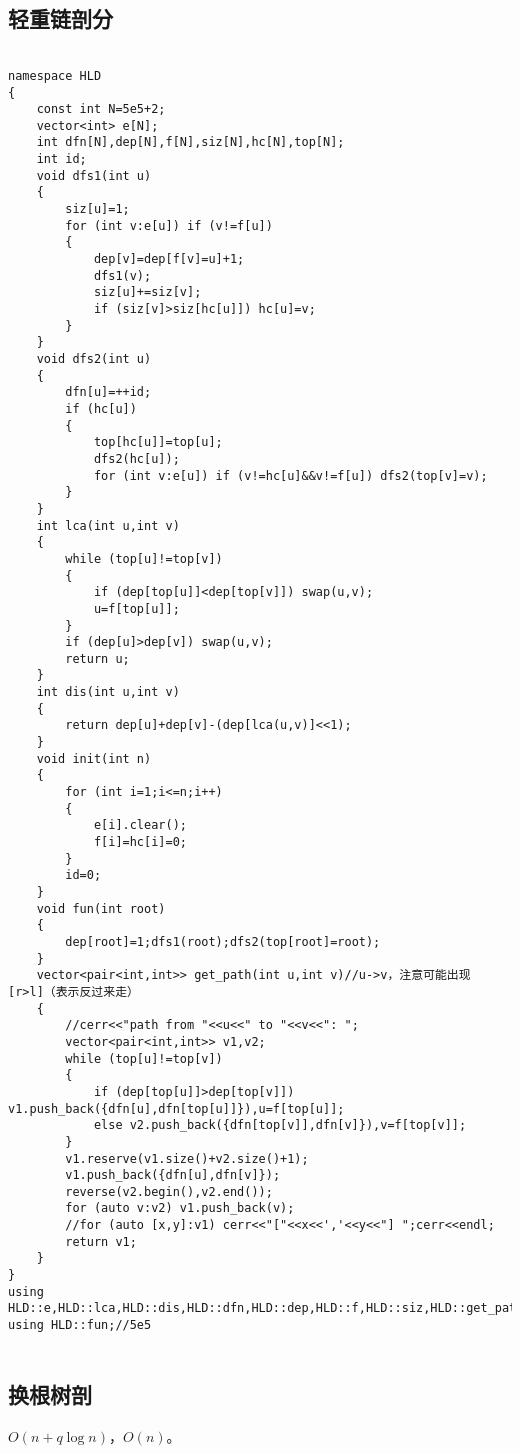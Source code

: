 \documentclass[12pt]{ctexart}
\begin{document}
\subsection{轻重链剖分}

\begin{lstlisting}

namespace HLD
{
	const int N=5e5+2;
	vector<int> e[N];
	int dfn[N],dep[N],f[N],siz[N],hc[N],top[N];
	int id;
	void dfs1(int u)
	{
		siz[u]=1;
		for (int v:e[u]) if (v!=f[u])
		{
			dep[v]=dep[f[v]=u]+1;
			dfs1(v);
			siz[u]+=siz[v];
			if (siz[v]>siz[hc[u]]) hc[u]=v;
		}
	}
	void dfs2(int u)
	{
		dfn[u]=++id;
		if (hc[u])
		{
			top[hc[u]]=top[u];
			dfs2(hc[u]);
			for (int v:e[u]) if (v!=hc[u]&&v!=f[u]) dfs2(top[v]=v);
		}
	}
	int lca(int u,int v)
	{
		while (top[u]!=top[v])
		{
			if (dep[top[u]]<dep[top[v]]) swap(u,v);
			u=f[top[u]];
		}
		if (dep[u]>dep[v]) swap(u,v);
		return u;
	}
	int dis(int u,int v)
	{
		return dep[u]+dep[v]-(dep[lca(u,v)]<<1);
	}
	void init(int n)
	{
		for (int i=1;i<=n;i++)
		{
			e[i].clear();
			f[i]=hc[i]=0;
		}
		id=0;
	}
	void fun(int root)
	{
		dep[root]=1;dfs1(root);dfs2(top[root]=root);
	}
	vector<pair<int,int>> get_path(int u,int v)//u->v，注意可能出现 [r>l]（表示反过来走）
	{
		//cerr<<"path from "<<u<<" to "<<v<<": ";
		vector<pair<int,int>> v1,v2;
		while (top[u]!=top[v])
		{
			if (dep[top[u]]>dep[top[v]]) v1.push_back({dfn[u],dfn[top[u]]}),u=f[top[u]];
			else v2.push_back({dfn[top[v]],dfn[v]}),v=f[top[v]];
		}
		v1.reserve(v1.size()+v2.size()+1);
		v1.push_back({dfn[u],dfn[v]});
		reverse(v2.begin(),v2.end());
		for (auto v:v2) v1.push_back(v);
		//for (auto [x,y]:v1) cerr<<"["<<x<<','<<y<<"] ";cerr<<endl;
		return v1;
	}
}
using HLD::e,HLD::lca,HLD::dis,HLD::dfn,HLD::dep,HLD::f,HLD::siz,HLD::get_path;
using HLD::fun;//5e5


\end{lstlisting}

\subsection{换根树剖}

$O(n+q\log n)$，$O(n)$。
\end{document}
